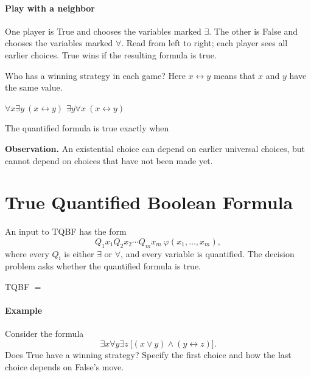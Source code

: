 \documentclass[11  pt]{article}
\begin{document}
\paragraph{Play with a neighbor}
One player is True and chooses the variables marked $\exists$. The other is False and chooses the variables marked $\forall$. Read from left to right; each player sees all earlier choices. True wins if the resulting formula is true.

\begin{Qu}
    Who has a winning strategy in each game? Here $x\leftrightarrow y$ means that $x$ and $y$ have the same value.
    \begin{itemize}
        \aitem $\forall x\exists y\ (x\leftrightarrow y)$
        \vs{1cm}
        \bitem $\exists y\forall x\ (x\leftrightarrow y)$
        \vs{1cm}
    \end{itemize}
\end{Qu}

The quantified formula is true exactly when 

\vfill
\textbf{Observation.} An existential choice can depend on earlier universal choices, but cannot depend on choices that have not been made yet.

\newpage
\section{True Quantified Boolean Formula}
An input to \textsc{TQBF} has the form
\begin{equation*}
    Q_1x_1Q_2x_2\cdots Q_mx_m\ \varphi(x_1,\ldots,x_m),
\end{equation*}
where every $Q_i$ is either $\exists$ or $\forall$, and every variable is quantified. The decision problem asks whether the quantified formula is true.

\begin{center}
    \textsc{TQBF} $=\phantom{\{\langle\Phi\rangle:\Phi\text{ is a true quantified Boolean formula}\}}$
\end{center}

\paragraph{Example}
Consider the formula
\begin{equation*}
    \exists x\forall y\exists z\ \big[(x\lor y)\land(y\leftrightarrow z)\big].
\end{equation*}
Does True have a winning strategy? Specify the first choice and how the last choice depends on False's move.
\vs{2cm}
\end{document}
